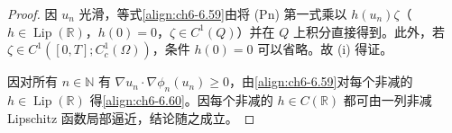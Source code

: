 \documentclass[../../main.tex]{subfiles}%
\begin{document}
\begin{proof}
因 $u_n$ 光滑，等式\eqref{align:ch6-6.59}由将 (Pn) 第一式乘以 $h(u_n)\zeta$（$h\in\operatorname{Lip}(\mathbb{R})$，$h(0)=0$，$\zeta\in C^1(Q)$）并在 $Q$ 上积分直接得到。此外，若 $\zeta\in C^1([0,T];C^1_c(\Omega))$，条件 $h(0)=0$ 可以省略。故 (i) 得证。

因对所有 $n\in\mathbb{N}$ 有 $\nabla u_n\cdot\nabla\phi_n(u_n)\geqslant0$，由\eqref{align:ch6-6.59}对每个非减的 $h\in\operatorname{Lip}(\mathbb{R})$ 得\eqref{align:ch6-6.60}。因每个非减的 $h\in C(\mathbb{R})$ 都可由一列非减 Lipschitz 函数局部逼近，结论随之成立。
\end{proof}

\end{document}
